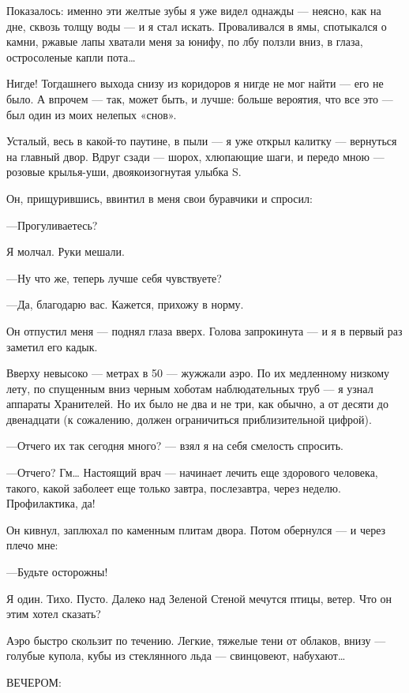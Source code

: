 \documentclass[11pt,openany]{book}
\begin{document}
Показалось: именно эти желтые зубы я уже видел однажды --- неясно, как на дне, сквозь толщу воды --- и я стал искать. Проваливался в ямы, спотыкался о камни, ржавые лапы хватали меня за юнифу, по лбу ползли вниз, в глаза, остросоленые капли пота\ldots{}

Нигде! Тогдашнего выхода снизу из коридоров я нигде не мог найти --- его не было. А впрочем --- так, может быть, и лучше: больше вероятия, что все это --- был один из моих нелепых «снов».

Усталый, весь в какой-то паутине, в пыли --- я уже открыл калитку --- вернуться на главный двор. Вдруг сзади --- шорох, хлюпающие шаги, и передо мною --- розовые крылья-уши, двоякоизогнутая улыбка S.

Он, прищурившись, ввинтил в меня свои буравчики и спросил:

---Прогуливаетесь?

Я молчал. Руки мешали.

---Ну что же, теперь лучше себя чувствуете?

---Да, благодарю вас. Кажется, прихожу в норму.

Он отпустил меня --- поднял глаза вверх. Голова запрокинута --- и я в первый раз заметил его кадык.

Вверху невысоко --- метрах в 50 --- жужжали аэро. По их медленному низкому лету, по спущенным вниз черным хоботам наблюдательных труб --- я узнал аппараты Хранителей. Но их было не два и не три, как обычно, а от десяти до двенадцати (к сожалению, должен ограничиться приблизительной цифрой).

---Отчего их так сегодня много? --- взял я на себя смелость спросить.

---Отчего? Гм\ldots{} Настоящий врач --- начинает лечить еще здорового человека, такого, какой заболеет еще только завтра, послезавтра, через неделю. Профилактика, да!

Он кивнул, заплюхал по каменным плитам двора. Потом обернулся --- и через плечо мне:

---Будьте осторожны!

Я один. Тихо. Пусто. Далеко над Зеленой Стеной мечутся птицы, ветер. Что он этим хотел сказать?

Аэро быстро скользит по течению. Легкие, тяжелые тени от облаков, внизу --- голубые купола, кубы из стеклянного льда --- свинцовеют, набухают\ldots{}

\begin{center}\textsc{ВЕЧЕРОМ:}\end{center}
\end{document}
